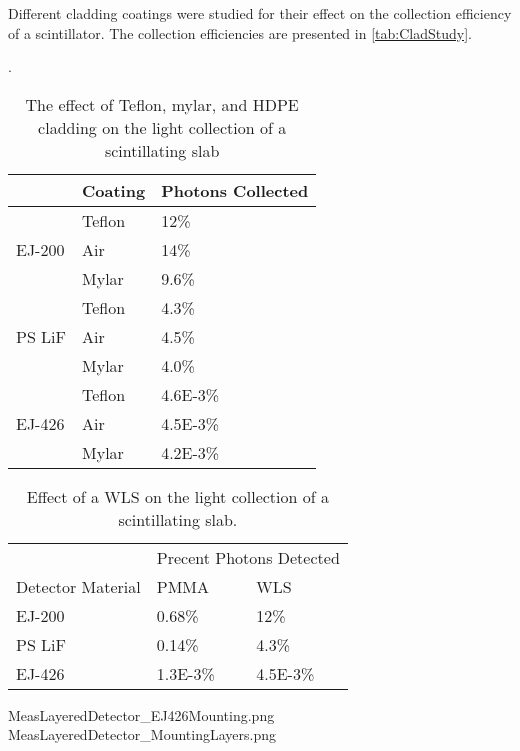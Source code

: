 Different cladding coatings were studied for their effect on the collection efficiency of a scintillator.
The collection efficiencies are presented in \autoref{tab:CladStudy}.
\begin{table}
  \caption[Teflon, Mylar, and HDPE Cladding Light Collection Effect]{The effect of Teflon, mylar, and HDPE cladding on the light collection of a scintillating slab}.
  \label{tab:CladStudy}
  \begin{tabular}{p{4cm} m{3cm} m{3cm}}
  \toprule
  & Coating & Photons Collected \\
  \midrule 
  \multirow{3}{*}{EJ-200} & Teflon & 12\% \\
  				      & Air &  14\% \\
				      & Mylar & 9.6\% \\
  \midrule 
  \multirow{3}{*}{PS LiF} & Teflon & 4.3\% \\
  				      & Air & 4.5\% \\
				      & Mylar & 4.0\% \\
  \midrule 
  \multirow{3}{*}{EJ-426} & Teflon & \num{4.6E-3}\% \\
  				      & Air & \num{4.5E-3}\% \\
				      & Mylar & \num{4.2E-3}\% \\
 \bottomrule				 	   				  
  \end{tabular}
\end{table}
  \begin{table}
  \caption[Light Collection Increase with a WLS Bar]{Effect of a WLS on the light collection of a scintillating slab.}
  \label{tab:WLSStudy}
  \begin{tabular}{p{4cm} m{3cm} m{3cm}}
  \toprule
  & \multicolumn{2}{c}{Precent Photons Detected} \\
  Detector Material & PMMA &  WLS \\
  \midrule
 EJ-200 & 0.68\%  & 12\% \\
 PS LiF & 0.14\% & 4.3\% \\
 EJ-426 & \num{1.3E-3}\% & \num{4.5E-3}\% \\
 \bottomrule
  \end{tabular}
\end{table}


MeasLayeredDetector_EJ426Mounting.png
MeasLayeredDetector_MountingLayers.png
